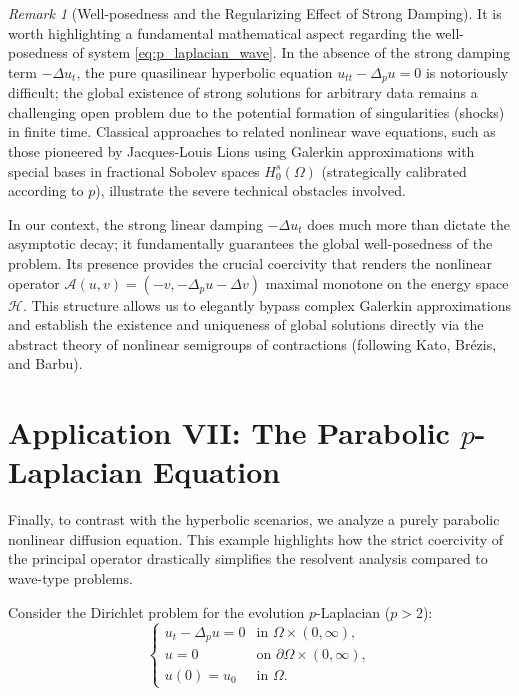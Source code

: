 \documentclass[11pt,reqno]{amsart}
\theoremstyle{remark}
\newtheorem{remark}[theorem]{Remark}
\begin{document}
\begin{remark}[Well-posedness and the Regularizing Effect of Strong Damping]
\label{rem:lions_existence}
It is worth highlighting a fundamental mathematical aspect regarding the well-posedness of system \eqref{eq:p_laplacian_wave}. In the absence of the strong damping term $-\Delta u_t$, the pure quasilinear hyperbolic equation $u_{tt} - \Delta_p u = 0$ is notoriously difficult; the global existence of strong solutions for arbitrary data remains a challenging open problem due to the potential formation of singularities (shocks) in finite time. Classical approaches to related nonlinear wave equations, such as those pioneered by Jacques-Louis Lions using Galerkin approximations with special bases in fractional Sobolev spaces $H_0^s(\Omega)$ (strategically calibrated according to $p$), illustrate the severe technical obstacles involved.

In our context, the strong linear damping $-\Delta u_t$ does much more than dictate the asymptotic decay; it fundamentally guarantees the global well-posedness of the problem. Its presence provides the crucial coercivity that renders the nonlinear operator $\mathcal{A}(u,v) = (-v, -\Delta_p u - \Delta v)$ maximal monotone on the energy space $\mathcal{H}$. This structure allows us to elegantly bypass complex Galerkin approximations and establish the existence and uniqueness of global solutions directly via the abstract theory of nonlinear semigroups of contractions (following Kato, Brézis, and Barbu).
\end{remark}




\section{Application VII: The Parabolic $p$-Laplacian Equation}
\label{sec:parabolic_p}

Finally, to contrast with the hyperbolic scenarios, we analyze a purely parabolic nonlinear diffusion equation. This example highlights how the strict coercivity of the principal operator drastically simplifies the resolvent analysis compared to wave-type problems.

Consider the Dirichlet problem for the evolution $p$-Laplacian ($p > 2$):
\begin{equation} \label{eq:parabolic_p}
\begin{cases}
u_{t} - \Delta_p u = 0 & \text{in } \Omega \times (0, \infty), \\
u = 0 & \text{on } \partial\Omega \times (0, \infty), \\
u(0) = u_0 & \text{in } \Omega.
\end{cases}
\end{equation}
\end{document}

